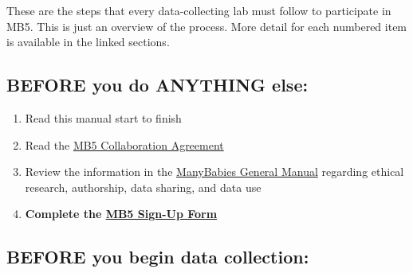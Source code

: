 \documentclass[
  letterpaper,
  DIV=11,
  numbers=noendperiod,
  oneside]{scrreprt}
\providecommand{\tightlist}{%
  \setlength{\itemsep}{0pt}\setlength{\parskip}{0pt}}
\begin{document}
These are the steps that every data-collecting lab must follow to
participate in MB5. This is just an overview of the process. More detail
for each numbered item is available in the linked sections.

\subsection{BEFORE you do ANYTHING
else:}\label{before-you-do-anything-else}

\begin{enumerate}
\def\labelenumi{(\arabic{enumi})}
\tightlist
\item
  Read this manual start to finish
\item
  Read the
  \href{https://docs.google.com/document/d/1vbTDmH6euda5pJN4uyds3zsnQ1DXrW9wpHogwC-5TSk/edit?usp=sharing}{MB5
  Collaboration Agreement}
\item
  Review the information in the
  \href{https://docs.google.com/document/d/e/2PACX-1vQT9a2lYPUclD_Mbqz_sca4NZq6tCb1HzfMSt9EEQt54mAb55vrkE3J6_6uydYAH-afCdSCaSELycAI/pub}{ManyBabies
  General Manual} regarding ethical research, authorship, data sharing,
  and data use
\item
  \textbf{Complete the
  \href{https://airtable.com/appRoqMKzcK3NsXt4/pag99dsjlXiM24ZnB/form}{MB5
  Sign-Up Form}}
\end{enumerate}

\subsection{BEFORE you begin data
collection:}\label{before-you-begin-data-collection}
\end{document}
